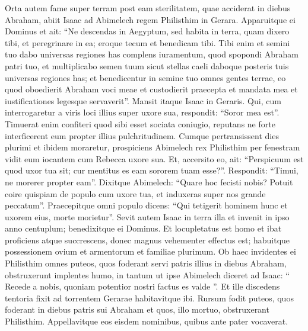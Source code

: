 \begin{biblechapter}
\begin{biblechapter}
\begin{biblechapter}
\begin{biblechapter}
\begin{biblechapter}
\begin{biblechapter}
\begin{biblechapter}
\begin{biblechapter}
\begin{biblechapter}
\begin{biblechapter}
\begin{biblechapter}
\begin{biblechapter}
\begin{biblechapter}
\begin{biblechapter}
\begin{biblechapter}
\begin{biblechapter}
\begin{biblechapter}
\begin{biblechapter}
\begin{biblechapter}
\begin{biblechapter}
\begin{biblechapter}
\begin{biblechapter}
\begin{biblechapter}
\begin{biblechapter}
\begin{biblechapter}
\begin{biblechapter}
\verse Orta autem fame super terram post eam sterilitatem, quae acciderat in diebus Abraham, abiit Isaac ad Abimelech regem Philisthim in Gerara. 
\verse Apparuitque ei Dominus et ait: “Ne descendas in Aegyptum, sed habita in terra, quam dixero tibi, 
\verse et peregrinare in ea; eroque tecum et benedicam tibi. Tibi enim et semini tuo dabo universas regiones has complens iuramentum, quod spopondi Abraham patri tuo, 
\verse et multiplicabo semen tuum sicut stellas caeli daboque posteris tuis universas regiones has; et benedicentur in semine tuo omnes gentes terrae, 
\verse eo quod oboedierit Abraham voci meae et custodierit praecepta et mandata mea et iustificationes legesque servaverit”. 
\verse Mansit itaque Isaac in Geraris.
 \verse Qui, cum interrogaretur a viris loci illius super uxore sua, respondit: “Soror mea est”. Timuerat enim confiteri quod sibi esset sociata coniugio, reputans ne forte interficerent eum propter illius pulchritudinem. 
\verse Cumque pertransissent dies plurimi et ibidem moraretur, prospiciens Abimelech rex Philisthim per fenestram vidit eum iocantem cum Rebecca uxore sua. 
\verse Et, accersito eo, ait: “Perspicuum est quod uxor tua sit; cur mentitus es eam sororem tuam esse?”. Respondit: “Timui, ne morerer propter eam”. 
\verse Dixitque Abimelech: “Quare hoc fecisti nobis? Potuit coire quispiam de populo cum uxore tua, et induxeras super nos grande peccatum”. Praecepitque omni populo dicens: 
 \verse “Qui tetigerit hominem hunc et uxorem eius, morte morietur”.
 \verse Sevit autem Isaac in terra illa et invenit in ipso anno centuplum; benedixitque ei Dominus. 
\verse Et locupletatus est homo et ibat proficiens atque succrescens, donec magnus vehementer effectus est; 
\verse habuitque possessionem ovium et armentorum et familiae plurimum.
 Ob haec invidentes ei Philisthim 
\verse omnes puteos, quos foderant servi patris illius in diebus Abraham, obstruxerunt implentes humo, 
\verse in tantum ut ipse Abimelech diceret ad Isaac: “ Recede a nobis, quoniam potentior nostri factus es valde ”.
 \verse Et ille discedens tentoria fixit ad torrentem Gerarae habitavitque ibi. 
 \verse Rursum fodit puteos, quos foderant in diebus patris sui Abraham et quos, illo mortuo, obstruxerant Philisthim. Appellavitque eos eisdem nominibus, quibus ante pater vocaverat. 

\end{biblechapter}
\end{biblechapter}
\end{biblechapter}
\end{biblechapter}
\end{biblechapter}
\end{biblechapter}
\end{biblechapter}
\end{biblechapter}
\end{biblechapter}
\end{biblechapter}
\end{biblechapter}
\end{biblechapter}
\end{biblechapter}
\end{biblechapter}
\end{biblechapter}
\end{biblechapter}
\end{biblechapter}
\end{biblechapter}
\end{biblechapter}
\end{biblechapter}
\end{biblechapter}
\end{biblechapter}
\end{biblechapter}
\end{biblechapter}
\end{biblechapter}
\end{biblechapter}
